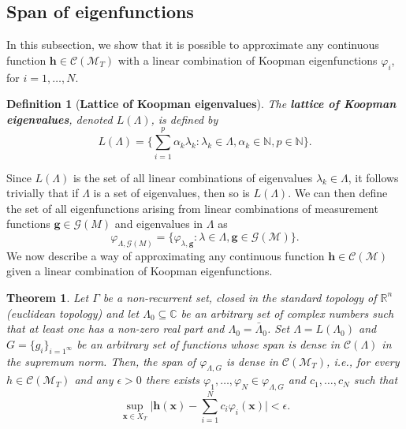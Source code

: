 \documentclass[]{article}
\newtheorem{definition}{Definition}
\newtheorem{theorem}{Theorem}
\begin{document}
\subsection{Span of eigenfunctions}
In this subsection, we show that it is possible to approximate any continuous function $\textbf{h} \in \mathcal{C}(\mathcal{M}_T)$ with a linear combination of Koopman eigenfunctions $\varphi_i$, for $i=1,\dots,N$.
\begin{definition}[\textbf{Lattice of Koopman eigenvalues}]
The \textbf{lattice of Koopman eigenvalues}, denoted $L(\Lambda)$, is defined by
\begin{equation}
	L(\Lambda) = \bigg\{\sum_{i=1}^p \alpha_k \lambda_k: \lambda_k \in \Lambda, \alpha_k \in \mathbb{N}, p \in \mathbb{N}\bigg\}.
\end{equation}
\end{definition}
Since $L(\Lambda)$ is the set of all linear combinations of eigenvalues $\lambda_k \in \Lambda$, it follows trivially that if $\Lambda$ is a set of eigenvalues, then so is $L(\Lambda)$. We can then define the set of all eigenfunctions arising from linear combinations of measurement functions $\textbf{g} \in \mathcal{G}(M)$ and eigenvalues in $\Lambda$ as
\begin{equation}
	\varphi_{\Lambda, \mathcal{G}(M)} = \{\varphi_{\lambda, \textbf{g}}: \lambda \in \Lambda, \textbf{g} \in \mathcal{G}(\mathcal{M})\}.
\end{equation}
We now describe a way of approximating any continuous function $\textbf{h} \in \mathcal{C}(\mathcal{M})$ given a linear combination of Koopman eigenfunctions.
\begin{theorem}
Let $\Gamma$ be a non-recurrent set, closed in the standard topology of $\mathbb{R}^n$ (euclidean topology) and let $\Lambda_0 \subseteq \mathbb{C}$ be an arbitrary set of complex numbers such that at least one has a non-zero real part and $\Lambda_0=\bar{\Lambda}_0$. Set $\Lambda = L(\Lambda_0)$ and $G=\{g_i\}_{i=1^{\infty}}$ be an arbitrary set of functions whose span is dense in $\mathcal{C}(\Lambda)$ in the supremum norm. Then, the span of $\varphi_{\Lambda, G}$ is dense in $\mathcal{C}(\mathcal{M}_T)$, i.e., for every $h \in \mathcal{C}(\mathcal{M}_T)$ and any $\epsilon > 0$ there exists $\varphi_1,\dots,\varphi_N \in \varphi_{\Lambda,G}$ and $c_1,\dots,c_N$ such that
\begin{equation}
	\sup_{\textbf{x} \in X_T} \bigg|\textbf{h}(\textbf{x})-\sum_{i=1}^N c_i \varphi_i(\textbf{x})\bigg| < \epsilon.
\end{equation}
\end{theorem}
\end{document}
